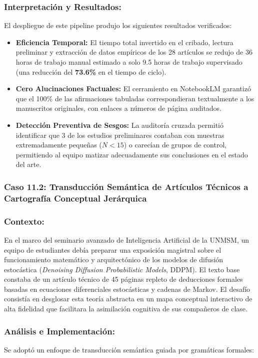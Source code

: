 \subsubsection*{Interpretación y Resultados:}
El despliegue de este pipeline produjo los siguientes resultados verificados:
\begin{itemize}
    \item \textbf{Eficiencia Temporal:} El tiempo total invertido en el cribado, lectura preliminar y extracción de datos empíricos de los 28 artículos se redujo de 36 horas de trabajo manual estimado a solo 9.5 horas de trabajo supervisado (una reducción del \textbf{73.6\%} en el tiempo de ciclo).
    \item \textbf{Cero Alucinaciones Factuales:} El cerramiento en NotebookLM garantizó que el 100\% de las afirmaciones tabuladas correspondieran textualmente a los manuscritos originales, con enlaces a números de página auditados.
    \item \textbf{Detección Preventiva de Sesgos:} La auditoría cruzada permitió identificar que 3 de los estudios preliminares contaban con muestras extremadamente pequeñas ($N < 15$) o carecían de grupos de control, permitiendo al equipo matizar adecuadamente sus conclusiones en el estado del arte.
\end{itemize}

\subsubsection{Caso 11.2: Transducción Semántica de Artículos Técnicos a Cartografía Conceptual Jerárquica}

\subsubsection*{Contexto:}
En el marco del seminario avanzado de Inteligencia Artificial de la UNMSM, un equipo de estudiantes debía preparar una exposición magistral sobre el funcionamiento matemático y arquitectónico de los modelos de difusión estocástica (\textit{Denoising Diffusion Probabilistic Models}, DDPM). El texto base constaba de un artículo técnico de 45 páginas repleto de deducciones formales basadas en ecuaciones diferenciales estocásticas y cadenas de Markov. El desafío consistía en desglosar esta teoría abstracta en un mapa conceptual interactivo de alta fidelidad que facilitara la asimilación cognitiva de sus compañeros de clase.

\subsubsection*{Análisis e Implementación:}
Se adoptó un enfoque de transducción semántica guiada por gramáticas formales:

